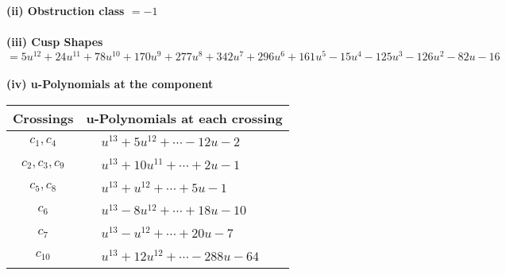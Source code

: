 \documentclass[1p]{elsarticle_modified}
\theoremstyle{definition}
\begin{document}
\flushleft \textbf{(ii) Obstruction class $= -1$}\\~\\
\flushleft \textbf{(iii) Cusp Shapes $= 5 u^{12}+24 u^{11}+78 u^{10}+170 u^9+277 u^8+342 u^7+296 u^6+161 u^5-15 u^4-125 u^3-126 u^2-82 u-16$}\\~\\
\newpage\renewcommand{\arraystretch}{1}
\flushleft \textbf{(iv) u-Polynomials at the component}\newline \\
\begin{tabular}{m{50pt}|m{274pt}}
Crossings & \hspace{64pt}u-Polynomials at each crossing \\
\hline $$\begin{aligned}c_{1},c_{4}\end{aligned}$$&$\begin{aligned}
&u^{13}+5 u^{12}+\cdots-12 u-2
\end{aligned}$\\
\hline $$\begin{aligned}c_{2},c_{3},c_{9}\end{aligned}$$&$\begin{aligned}
&u^{13}+10 u^{11}+\cdots+2 u-1
\end{aligned}$\\
\hline $$\begin{aligned}c_{5},c_{8}\end{aligned}$$&$\begin{aligned}
&u^{13}+u^{12}+\cdots+5 u-1
\end{aligned}$\\
\hline $$\begin{aligned}c_{6}\end{aligned}$$&$\begin{aligned}
&u^{13}-8 u^{12}+\cdots+18 u-10
\end{aligned}$\\
\hline $$\begin{aligned}c_{7}\end{aligned}$$&$\begin{aligned}
&u^{13}- u^{12}+\cdots+20 u-7
\end{aligned}$\\
\hline $$\begin{aligned}c_{10}\end{aligned}$$&$\begin{aligned}
&u^{13}+12 u^{12}+\cdots-288 u-64
\end{aligned}$\\
\hline
\end{tabular}\\~\\
\end{document}
